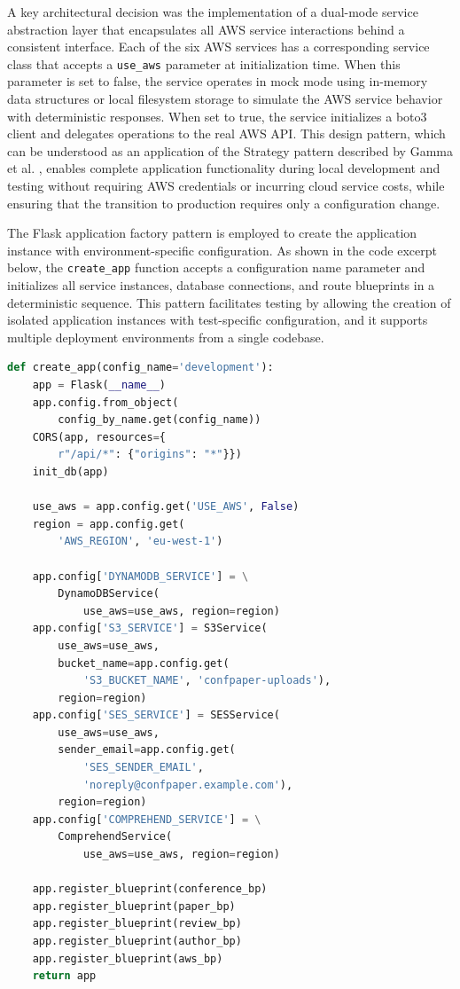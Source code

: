 \documentclass[conference]{IEEEtran}
\begin{document}
A key architectural decision was the implementation of a dual-mode service abstraction layer that encapsulates all AWS service interactions behind a consistent interface. Each of the six AWS services has a corresponding service class that accepts a \texttt{use\_aws} parameter at initialization time. When this parameter is set to false, the service operates in mock mode using in-memory data structures or local filesystem storage to simulate the AWS service behavior with deterministic responses. When set to true, the service initializes a boto3 client and delegates operations to the real AWS API. This design pattern, which can be understood as an application of the Strategy pattern described by Gamma et al. \cite{gamma1994}, enables complete application functionality during local development and testing without requiring AWS credentials or incurring cloud service costs, while ensuring that the transition to production requires only a configuration change.

The Flask application factory pattern is employed to create the application instance with environment-specific configuration. As shown in the code excerpt below, the \texttt{create\_app} function accepts a configuration name parameter and initializes all service instances, database connections, and route blueprints in a deterministic sequence. This pattern facilitates testing by allowing the creation of isolated application instances with test-specific configuration, and it supports multiple deployment environments from a single codebase.

\begin{lstlisting}[language=Python, caption={Application factory with service initialization}]
def create_app(config_name='development'):
    app = Flask(__name__)
    app.config.from_object(
        config_by_name.get(config_name))
    CORS(app, resources={
        r"/api/*": {"origins": "*"}})
    init_db(app)

    use_aws = app.config.get('USE_AWS', False)
    region = app.config.get(
        'AWS_REGION', 'eu-west-1')

    app.config['DYNAMODB_SERVICE'] = \
        DynamoDBService(
            use_aws=use_aws, region=region)
    app.config['S3_SERVICE'] = S3Service(
        use_aws=use_aws,
        bucket_name=app.config.get(
            'S3_BUCKET_NAME', 'confpaper-uploads'),
        region=region)
    app.config['SES_SERVICE'] = SESService(
        use_aws=use_aws,
        sender_email=app.config.get(
            'SES_SENDER_EMAIL',
            'noreply@confpaper.example.com'),
        region=region)
    app.config['COMPREHEND_SERVICE'] = \
        ComprehendService(
            use_aws=use_aws, region=region)

    app.register_blueprint(conference_bp)
    app.register_blueprint(paper_bp)
    app.register_blueprint(review_bp)
    app.register_blueprint(author_bp)
    app.register_blueprint(aws_bp)
    return app
\end{lstlisting}
\end{document}
